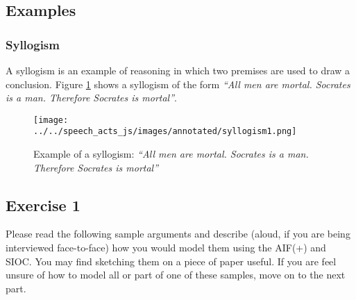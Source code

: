 \subsection{Examples}
\subsubsection{Syllogism}
A syllogism is an example of reasoning in which two premises are used to draw a conclusion. Figure \ref{figure:syllogism1} shows a syllogism of the form \textit{``All men are mortal. Socrates is a man. Therefore Socrates is mortal''}.

\begin{figure}[H]
\centering
\texttt{[image: ../../speech\_acts\_js/images/annotated/syllogism1.png]}
\caption{Example of a syllogism: \textit{``All men are mortal. Socrates is a man. Therefore Socrates is mortal''}}
\label{figure:syllogism1}
\end{figure}

\subsection{Exercise 1}
Please read the following sample arguments and describe (aloud, if you are being interviewed face-to-face) how you would model them using the AIF(+) and SIOC. You may find sketching them on a piece of paper useful. If you are feel unsure of how to model all or part of one of these samples, move on to the next part.

